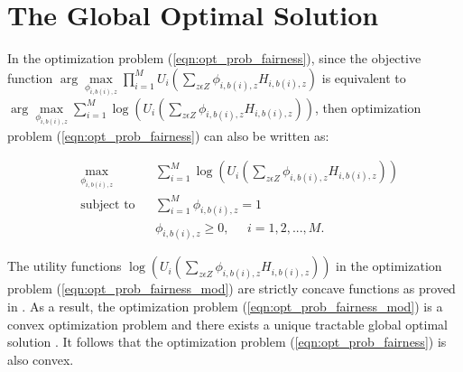 \documentclass[conference]{IEEEtran}
\begin{document}
\section{The Global Optimal Solution}\label{sec:Proof}

In the optimization problem (\ref{eqn:opt_prob_fairness}), since the objective function $\arg \underset{\textbf{$\phi_{i,b(i),z}$}} \max \prod_{i=1}^{M}U_i(\sum_{z\epsilon Z}\phi_{i,b(i),z} H_{i,b(i),z})$ is equivalent to $\arg \underset{\textbf{$\phi_{i,b(i),z}$}} \max \sum_{i=1}^{M}\log(U_i(\sum_{z\epsilon Z}\phi_{i,b(i),z} H_{i,b(i),z}))$, then optimization problem (\ref{eqn:opt_prob_fairness}) can also be written as:

\begin{equation}\label{eqn:opt_prob_fairness_mod}
\begin{aligned}
& \underset{\textbf{$\phi_{i,b(i),z}$}} {\text{max}}
& & \sum_{i=1}^{M}\log(U_i(\sum_{z\epsilon Z}\phi_{i,b(i),z} H_{i,b(i),z})) \\
& \text{subject to}
& & \sum_{i=1}^{M}\phi_{i,b(i),z} =1\\
& & &  \phi_{i,b(i),z} \geq 0, \;\;\;\;\; i = 1,2, ...,M.
\end{aligned}
\end{equation}

The utility functions $\log(U_i(\sum_{z\epsilon Z}\phi_{i,b(i),z} H_{i,b(i),z}))$ in the optimization problem (\ref{eqn:opt_prob_fairness_mod}) are strictly concave functions as proved in \cite{Ahmed_Utility1}. As a result, the optimization problem (\ref{eqn:opt_prob_fairness_mod}) is a convex optimization problem and there exists a unique tractable global optimal solution \cite{Ahmed_Utility1}. It follows that the optimization problem (\ref{eqn:opt_prob_fairness}) is also convex. 
\end{document}

